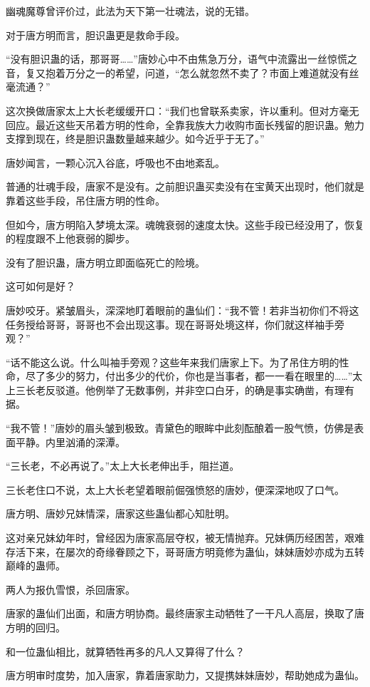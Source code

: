 \begin{this_body}
幽魂魔尊曾评价过，此法为天下第一壮魂法，说的无错。

对于唐方明而言，胆识蛊更是救命手段。

“没有胆识蛊的话，那哥哥……”唐妙心中不由焦急万分，语气中流露出一丝惊慌之音，复又抱着万分之一的希望，问道，“怎么就忽然不卖了？市面上难道就没有丝毫流通？”

这次换做唐家太上大长老缓缓开口：“我们也曾联系卖家，许以重利。但对方毫无回应。最近这些天吊着方明的性命，全靠我族大力收购市面长残留的胆识蛊。勉力支撑到现在，终是胆识蛊数量越来越少。如今近乎于无了。”

唐妙闻言，一颗心沉入谷底，呼吸也不由地紊乱。

普通的壮魂手段，唐家不是没有。之前胆识蛊买卖没有在宝黄天出现时，他们就是靠着这些手段，吊住唐方明的性命。

但如今，唐方明陷入梦境太深。魂魄衰弱的速度太快。这些手段已经没用了，恢复的程度跟不上他衰弱的脚步。

没有了胆识蛊，唐方明立即面临死亡的险境。

这可如何是好？

唐妙咬牙。紧皱眉头，深深地盯着眼前的蛊仙们：“我不管！若非当初你们不将这任务授给哥哥，哥哥也不会出现这事。现在哥哥处境这样，你们就这样袖手旁观？”

“话不能这么说。什么叫袖手旁观？这些年来我们唐家上下。为了吊住方明的性命，尽了多少的努力，付出多少的代价，你也是当事者，都一一看在眼里的……”太上三长老反驳道。他例举了无数事例，并非空口白牙，的确是事实确凿，有理有据。

“我不管！”唐妙的眉头皱到极致。青黛色的眼眸中此刻酝酿着一股气愤，仿佛是表面平静。内里汹涌的深潭。

“三长老，不必再说了。”太上大长老伸出手，阻拦道。

三长老住口不说，太上大长老望着眼前倔强愤怒的唐妙，便深深地叹了口气。

唐方明、唐妙兄妹情深，唐家这些蛊仙都心知肚明。

这对亲兄妹幼年时，曾经因为唐家高层夺权，被无情抛弃。兄妹俩历经困苦，艰难存活下来，在屡次的奇缘眷顾之下，哥哥唐方明竟修为蛊仙，妹妹唐妙亦成为五转巅峰的蛊师。

两人为报仇雪恨，杀回唐家。

唐家的蛊仙们出面，和唐方明协商。最终唐家主动牺牲了一干凡人高层，换取了唐方明的回归。

和一位蛊仙相比，就算牺牲再多的凡人又算得了什么？

唐方明审时度势，加入唐家，靠着唐家助力，又提携妹妹唐妙，帮助她成为蛊仙。


\end{this_body}

